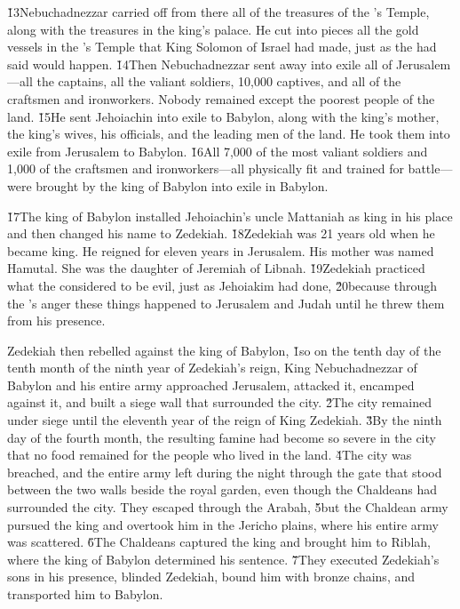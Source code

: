 \v{13}Nebuchadnezzar carried off from there all of the treasures of the 's Temple, along with the treasures in the king's palace. He cut into pieces all the gold vessels in the 's Temple that King Solomon of Israel had made, just as the  had said would happen. \v{14}Then Nebuchadnezzar sent away into exile all of Jerusalem---all the captains, all the valiant soldiers, 10,000 captives, and all of the craftsmen and ironworkers. Nobody remained except the poorest people of the land. \v{15}He sent Jehoiachin into exile to Babylon, along with the king's mother, the king's wives, his officials, and the leading men of the land. He took them into exile from Jerusalem to Babylon. \v{16}All 7,000 of the most valiant soldiers and 1,000 of the craftsmen and ironworkers---all physically fit and trained for battle---were brought by the king of Babylon into exile in Babylon.

\v{17}The king of Babylon installed Jehoiachin's uncle Mattaniah as king in his place and then changed his name to Zedekiah. \v{18}Zedekiah was 21 years old when he became king. He reigned for eleven years in Jerusalem. His mother was named Hamutal. She was the daughter of Jeremiah of Libnah. \v{19}Zedekiah practiced what the  considered to be evil, just as Jehoiakim had done, \v{20}because through the 's anger these things happened to Jerusalem and Judah until he threw them from his presence.

Zedekiah then rebelled against the king of Babylon,
\v{1}so on the tenth day of the tenth month of the ninth year of Zedekiah's reign, King Nebuchadnezzar of Babylon and his entire army approached Jerusalem, attacked it, encamped against it, and built a siege wall that surrounded the city. \v{2}The city remained under siege until the eleventh year of the reign of King Zedekiah. \v{3}By the ninth day of the fourth month, the resulting famine had become so severe in the city that no food remained for the people who lived in the land. \v{4}The city was breached, and the entire army left during the night through the gate that stood between the two walls beside the royal garden, even though the Chaldeans had surrounded the city. They escaped through the Arabah, \v{5}but the Chaldean army pursued the king and overtook him in the Jericho plains, where his entire army was scattered. \v{6}The Chaldeans captured the king and brought him to Riblah, where the king of Babylon determined his sentence. \v{7}They executed Zedekiah's sons in his presence, blinded Zedekiah, bound him with bronze chains, and transported him to Babylon.


